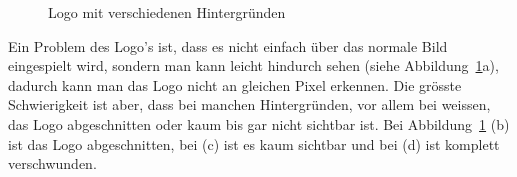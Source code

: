 \documentclass[12pt,a4paper]{report}
\begin{document}
\begin{figure}[h]%
    \centering
    \qquad
    \qquad
    \qquad
    \caption{Logo mit verschiedenen Hintergründen}%
    \label{fig:logo2}%
\end{figure}

Ein Problem des Logo's ist, dass es nicht einfach über das normale Bild eingespielt wird, sondern man kann leicht hindurch sehen (siehe Abbildung~\ref{fig:logo2}a),
dadurch kann man das Logo nicht an gleichen Pixel erkennen.
Die grösste Schwierigkeit ist aber, dass bei manchen Hintergründen, vor allem bei weissen, das Logo abgeschnitten oder kaum bis gar nicht sichtbar ist.
Bei Abbildung~\ref{fig:logo2} (b) ist das Logo abgeschnitten, bei (c) ist es kaum sichtbar und bei (d) ist komplett verschwunden.
\end{document}
